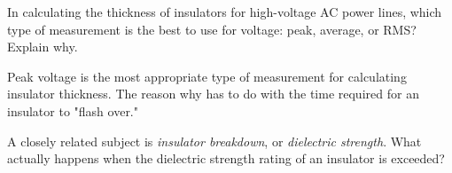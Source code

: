 

In calculating the thickness of insulators for high-voltage AC power lines, which type of measurement is the best to use for voltage: peak, average, or RMS?  Explain why.







Peak voltage is the most appropriate type of measurement for calculating insulator thickness.  The reason why has to do with the time required for an insulator to "flash over."







A closely related subject is {\it insulator breakdown}, or {\it dielectric strength}.  What actually happens when the dielectric strength rating of an insulator is exceeded?



